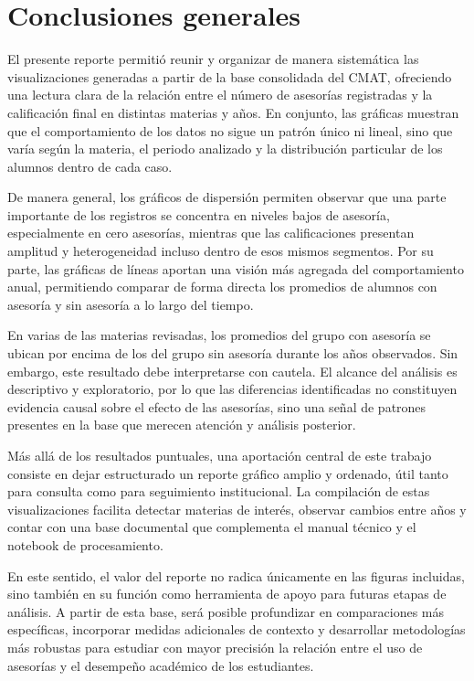 \documentclass[12pt]{article}
\begin{document}
\FloatBarrier


\section{Conclusiones generales}

El presente reporte permitió reunir y organizar de manera sistemática las visualizaciones generadas a partir de la base consolidada del CMAT, ofreciendo una lectura clara de la relación entre el número de asesorías registradas y la calificación final en distintas materias y años. En conjunto, las gráficas muestran que el comportamiento de los datos no sigue un patrón único ni lineal, sino que varía según la materia, el periodo analizado y la distribución particular de los alumnos dentro de cada caso.

De manera general, los gráficos de dispersión permiten observar que una parte importante de los registros se concentra en niveles bajos de asesoría, especialmente en cero asesorías, mientras que las calificaciones presentan amplitud y heterogeneidad incluso dentro de esos mismos segmentos. Por su parte, las gráficas de líneas aportan una visión más agregada del comportamiento anual, permitiendo comparar de forma directa los promedios de alumnos con asesoría y sin asesoría a lo largo del tiempo.

En varias de las materias revisadas, los promedios del grupo con asesoría se ubican por encima de los del grupo sin asesoría durante los años observados. Sin embargo, este resultado debe interpretarse con cautela. El alcance del análisis es descriptivo y exploratorio, por lo que las diferencias identificadas no constituyen evidencia causal sobre el efecto de las asesorías, sino una señal de patrones presentes en la base que merecen atención y análisis posterior.

Más allá de los resultados puntuales, una aportación central de este trabajo consiste en dejar estructurado un reporte gráfico amplio y ordenado, útil tanto para consulta como para seguimiento institucional. La compilación de estas visualizaciones facilita detectar materias de interés, observar cambios entre años y contar con una base documental que complementa el manual técnico y el notebook de procesamiento.

En este sentido, el valor del reporte no radica únicamente en las figuras incluidas, sino también en su función como herramienta de apoyo para futuras etapas de análisis. A partir de esta base, será posible profundizar en comparaciones más específicas, incorporar medidas adicionales de contexto y desarrollar metodologías más robustas para estudiar con mayor precisión la relación entre el uso de asesorías y el desempeño académico de los estudiantes.
\end{document}
